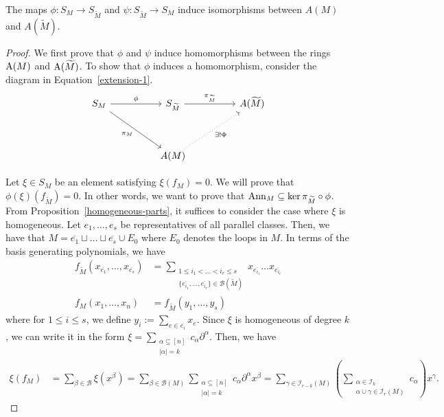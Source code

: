 \documentclass{puthesis-UG}
\begin{document}
\begin{thm} \label{only-simplification-matters}
	The maps $\phi : S_M \to S_{\widetilde{M}}$ and $\psi : S_{\widetilde{M}} \to S_M$ induce isomorphisms between $A(M)$ and $A(\widetilde{M})$. 
\end{thm}

\begin{proof}
	We first prove that $\phi$ and $\psi$ induce homomorphisms between the rings $\operatorname{A}(M)$ and $\operatorname{A}(\widetilde{M})$. To show that $\phi$ induces a homomorphism, consider the diagram in Equation~\ref{extension-1}.
	\begin{equation} \label{extension-1}
			\begin{tikzcd}
				{S_M} && {S_{\widetilde{M}}} && {A(\widetilde{M})} \\
				\\
				&& {A(M)}
				\arrow["\phi", from=1-1, to=1-3]
				\arrow["{\pi_{\widetilde{M}}}", from=1-3, to=1-5]
				\arrow["{\pi_M}"', from=1-1, to=3-3]
				\arrow["{\exists ! \Phi}"', dotted, from=3-3, to=1-5]
			\end{tikzcd}
	\end{equation}
		

Let $\xi \in S_M$ be an element satisfying $\xi (f_M) = 0$. We will prove that $\phi(\xi) (f_{\widetilde{M}}) = 0$. In other words, we want to prove that $\operatorname{Ann}_M \subseteq \ker \pi_{\widetilde{M}} \circ \phi$. From Proposition~\ref{homogeneous-parts}, it suffices to consider the case where $\xi$ is homogeneous. Let $e_1, \ldots, e_s$ be representatives of all parallel classes. Then, we have that $M = \overline{e_1} \sqcup \ldots \sqcup \overline{e_s} \cup E_0$ where $E_0$ denotes the loops in $M$. In terms of the basis generating polynomials, we have 
\begin{align*}
	f_{\widetilde{M}}(x_{\overline{e_1}}, \ldots, x_{\overline{e_s}}) & = \sum_{\substack{1 \leq i_1 < \ldots < i_r \leq s \\ \{\overline{e_{i_1}}, \ldots, \overline{e_{i_r}}\} \in \mathcal{B}(\widetilde{M})}} x_{\overline{e_{i_1}}} \ldots x_{\overline{e_{i_r}}} \\ 
	f_M(x_1, \ldots, x_n) & = f_{\widetilde{M}} \left ( y_1, \ldots, y_s \right )
\end{align*}
where for $1 \leq i \leq s$, we define $y_i := \sum_{e \in \overline{e_i}} x_e$. Since $\xi$ is homogeneous of degree $k$, we can write it in the form $\xi = \sum_{\substack{\alpha \subseteq [n] \\ |\alpha| = k}} c_\alpha \partial^\alpha$. Then, we have 
\begin{align} \label{karen}
	\xi (f_M) & = \sum_{\beta \in \mathcal{B}} \xi (x^\beta) = \sum_{\beta \in \mathcal{B}(M)} \sum_{\substack{\alpha \subseteq [n] \\ |\alpha| = k}} c_\alpha \partial^\alpha x^\beta = \sum_{\gamma \in \mathcal{I}_{r-k}(M)} \left ( \sum_{ \substack{\alpha \in \mathcal{I}_k \\ \alpha \cup \gamma \in \mathcal{I}_r(M)}} c_\alpha  \right ) x^\gamma. 
\end{align}


\end{proof}
\end{document}

